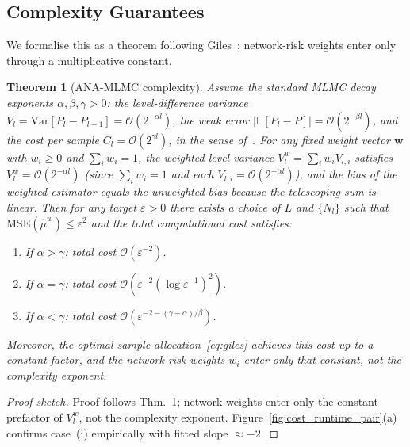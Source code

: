 \documentclass[pdflatex,sn-mathphys-num]{sn-jnl}
\theoremstyle{thmstyleone}%
\newtheorem{theorem}{Theorem}%
\theoremstyle{thmstyletwo}%
\theoremstyle{thmstylethree}%
\begin{document}
\subsection{Complexity Guarantees}
\label{subsec:complexity}

We formalise this as a theorem following Giles~\cite{giles2015multilevel}; network-risk weights enter only through a multiplicative constant.

\begin{theorem}[ANA-MLMC complexity]
\label{thm:complexity}
Assume the standard MLMC decay exponents $\alpha, \beta, \gamma > 0$: the level-difference
variance $V_l = \mathrm{Var}[P_l - P_{l-1}] = \mathcal{O}(2^{-\alpha l})$, the weak error
$|\mathbb{E}[P_l - P]| = \mathcal{O}(2^{-\beta l})$, and the cost per sample
$C_l = \mathcal{O}(2^{\gamma l})$, in the sense of~\cite{giles2015multilevel}.
For any fixed weight vector $\mathbf{w}$ with $w_i \ge 0$ and $\sum_i w_i = 1$,
the weighted level variance $V_l^w = \sum_i w_i V_{l,i}$ satisfies
$V_l^w = \mathcal{O}(2^{-\alpha l})$ (since $\sum_i w_i = 1$ and each $V_{l,i} = \mathcal{O}(2^{-\alpha l})$), and the bias
of the weighted estimator equals the unweighted bias because the telescoping sum
is linear.  Then for any target $\varepsilon > 0$ there exists a choice of $L$ and
$\{N_l\}$ such that $\mathrm{MSE}(\hat{\mu}^w) \le \varepsilon^2$ and the total
computational cost satisfies:
\begin{enumerate}
  \item[{\rm (i)}] If $\alpha > \gamma$: total cost $\mathcal{O}(\varepsilon^{-2})$.
  \item[{\rm (ii)}] If $\alpha = \gamma$: total cost
    $\mathcal{O}\!\left(\varepsilon^{-2}(\log\varepsilon^{-1})^2\right)$.
  \item[{\rm (iii)}] If $\alpha < \gamma$: total cost
    $\mathcal{O}\!\left(\varepsilon^{-2-(\gamma-\alpha)/\beta}\right)$.
\end{enumerate}
Moreover, the optimal sample allocation~\eqref{eq:giles} achieves this cost up to a
constant factor, and the network-risk weights $w_i$ enter only that constant, not the
complexity exponent.
\end{theorem}
\begin{proof}[Proof sketch]
Proof follows \cite{giles2015multilevel} Thm.~1; network weights enter only the constant
prefactor of $V_l^w$, not the complexity exponent.
Figure~\ref{fig:cost_runtime_pair}(a) confirms case~(i) empirically with fitted slope
$\approx{-2}$.
\end{proof}
\end{document}
